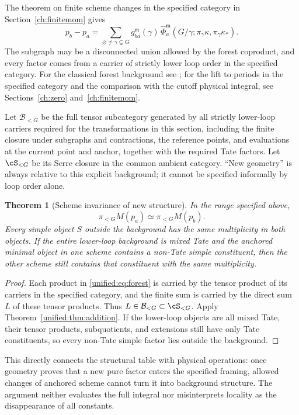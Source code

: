 \documentclass[11pt,a4paper,oneside]{article}
\theoremstyle{plain}
\newtheorem{theorem}{Theorem}[section]
\theoremstyle{definition}
\theoremstyle{remark}
\numberwithin{equation}{section}
\begin{document}
The theorem on finite scheme changes in the specified category in Section~\ref{ch:finitemom} gives
\begin{equation}\label{unified:eq:forest}
 p_b-p_a=\sum_{\varnothing\ne\gamma\subsetneq G}
 g_{ba}^{\mathfrak m}(\gamma)\,
 \widehat\Phi_a^{\mathfrak m}
 (G/\gamma;\pi_\gamma\kappa,\pi_\gamma\kappa_*).
\end{equation}
The subgraph may be a disconnected union allowed by the forest coproduct, and every factor comes from a carrier of strictly lower loop order in the specified category.
For the classical forest background see \cite{bk2012}; for the lift to periods in the specified category and the comparison with the cutoff physical integral, see Sections~\ref{ch:zero} and~\ref{ch:finitemom}.

Let $\mathcal B_{<G}$ be the full tensor subcategory generated by all strictly lower-loop carriers required for the transformations in this section,
including the finite closure under subgraphs and contractions, the reference points, and evaluations at the current point and anchor,
together with the required Tate factors. Let $\cS_{<G}$ be its Serre closure in the common ambient category.
``New geometry'' is always relative to this explicit background; it cannot be specified informally by loop order alone.

\begin{theorem}[Scheme invariance of new structure]\label{unified:thm:ren}
In the range specified above,
\[
 \pi_{<G}M(p_a)\simeq\pi_{<G}M(p_b).
\]
Every simple object $S$ outside the background has the same multiplicity in both objects.
If the entire lower-loop background is mixed Tate and the anchored minimal object in one scheme contains a non-Tate simple constituent,
then the other scheme still contains that constituent with the same multiplicity.
\end{theorem}
\begin{proof}
Each product in \eqref{unified:eq:forest} is carried by the tensor product of its carriers in the specified category,
and the finite sum is carried by the direct sum $L$ of these tensor products.
Thus $L\in\mathcal B_{<G}\subset\cS_{<G}$.
Apply Theorem~\ref{unified:thm:addition}.
If the lower-loop objects are all mixed Tate, their tensor products, subquotients, and extensions still have only Tate constituents,
so every non-Tate simple factor lies outside the background.
\end{proof}

This directly connects the structural table with physical operations: once geometry proves that a new pure factor enters the specified framing,
allowed changes of anchored scheme cannot turn it into background structure.
The argument neither evaluates the full integral nor misinterprets locality as the disappearance of all constants.
\end{document}
